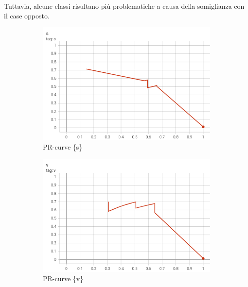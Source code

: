 Tuttavia, alcune classi risultano più problematiche a causa della somiglianza con il case opposto.
\begin{figure}[htbp]
    \centering
    \begin{subfigure}[t]{0.32\textwidth}
        \centering
        \includegraphics[width=\textwidth]{images/pr_curve_conf1.png}
        \caption{PR-curve \{s\}}
    \end{subfigure}
    \begin{subfigure}[t]{0.32\textwidth}
        \centering
        \includegraphics[width=\textwidth]{images/pr_curve_conf2.png}
        \caption{PR-curve \{v\}}
    \end{subfigure}
    \begin{subfigure}[t]{0.32\textwidth}
        \centering

\end{subfigure}
\end{figure}
